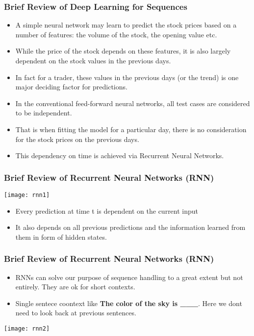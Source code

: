 \begin{frame}[fragile]
  \frametitle{Brief Review of Deep Learning for Sequences}
  \begin{itemize}
  \item A simple neural network may learn to predict the stock prices based on a number of features: the volume of the stock, the opening value etc. 
  \item While the price of the stock depends on these features, it is also largely dependent on the stock values in the previous days. 
  \item In fact for a trader, these values in the previous days (or the trend) is one major deciding factor for predictions.
  \item In the conventional feed-forward neural networks, all test cases are considered to be independent. 
  \item That is when fitting the model for a particular day, there is no consideration for the stock prices on the previous days.
  \item This dependency on time is achieved via Recurrent Neural Networks.
  	  \end{itemize}
 \end{frame} 
 
 
\begin{frame}[fragile]
  \frametitle{Brief Review of Recurrent Neural Networks (RNN)}
 \begin{center}
\texttt{[image: rnn1]}
\end{center}
  \begin{itemize}
  \item Every prediction at time t is dependent on the current input
  \item It also depends on all previous predictions and the information learned from them in form of hidden states.
   	  \end{itemize}

 \end{frame} 
 
\begin{frame}[fragile]
  \frametitle{Brief Review of Recurrent Neural Networks (RNN)}

  \begin{itemize}
  \item RNNs can solve our purpose of sequence handling to a great extent but not entirely. They are ok for short contexts.
  \item Single sentece coontext like \textbf{The color of the sky is \_\_\_}. Here we dont need to look back at previous sentences.
  
  	  \end{itemize}
  	   \begin{center}
\texttt{[image: rnn2]}
\end{center}
 \end{frame} 
 
